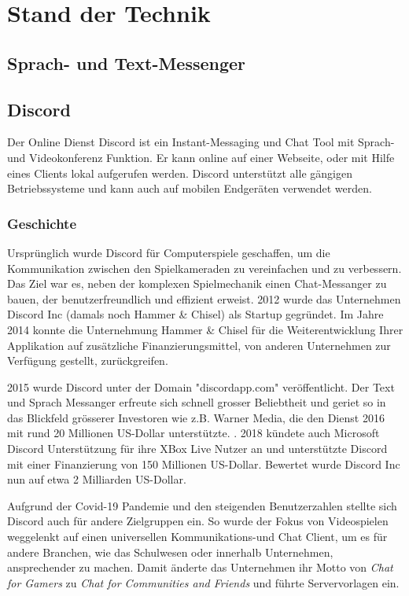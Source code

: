\documentclass[a4paper, table]{article}
\begin{document}
\newpage
\section{Stand der Technik}

\subsection{Sprach- und Text-Messenger}

\subsection{Discord}
Der Online Dienst Discord ist ein Instant-Messaging und Chat Tool mit Sprach- und Videokonferenz Funktion.
Er kann online auf einer Webseite, oder mit Hilfe eines Clients lokal aufgerufen werden.
Discord unterst\"utzt alle g\"angigen Betriebssysteme und kann auch auf mobilen Endger\"aten verwendet werden.

\subsubsection{Geschichte}
Urspr\"unglich wurde Discord f\"ur Computerspiele geschaffen, um die Kommunikation zwischen den Spielkameraden zu vereinfachen und zu verbessern.
Das Ziel war es, neben der komplexen Spielmechanik einen Chat-Messanger zu bauen, der benutzerfreundlich und effizient erweist.
2012 wurde das Unternehmen Discord Inc (damals noch Hammer \& Chisel)
als Startup gegr\"undet.\autocite{noauthor_discord_2021}
Im Jahre 2014 konnte die Unternehmung Hammer \& Chisel f\"ur die Weiterentwicklung Ihrer
Applikation auf zus\"atzliche Finanzierungsmittel, von anderen Unternehmen zur Verfügung gestellt, zurückgreifen.

2015 wurde Discord unter der Domain "discordapp.com" ver\"offentlicht.
Der Text und Sprach Messanger erfreute sich schnell grosser Beliebtheit
und geriet so in das Blickfeld grösserer Investoren wie z.B. Warner Media, die den Dienst 2016 mit rund
20 Millionen US-Dollar unterstützte. \autocite{noauthor_warner_2022} .
2018 k\"undete auch Microsoft Discord Unterst\"utzung f\"ur ihre XBox Live Nutzer an und unterst\"utzte Discord mit einer Finanzierung
von 150 Millionen US-Dollar. Bewertet wurde Discord Inc nun auf etwa 2 Milliarden US-Dollar.

Aufgrund der Covid-19 Pandemie und den steigenden Benutzerzahlen stellte sich Discord auch f\"ur andere Zielgruppen ein.
So wurde der Fokus von Videospielen weggelenkt auf einen universellen Kommunikations-und Chat Client, um es f\"ur andere Branchen,
wie das Schulwesen oder innerhalb Unternehmen, ansprechender zu machen.
Damit \"anderte das Unternehmen ihr Motto von \textit{Chat for Gamers} zu
\textit{Chat for Communities and Friends} und f\"uhrte Servervorlagen ein.
\end{document}
